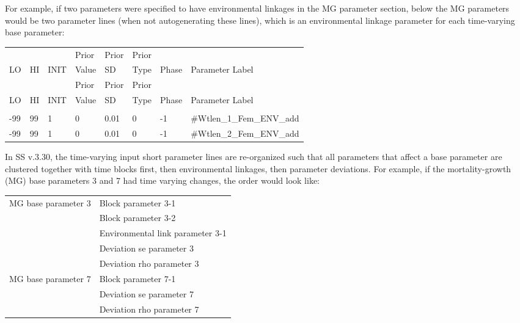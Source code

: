 For example, if two parameters were specified to have environmental linkages in the MG parameter section, below the MG parameters would be two parameter lines (when not autogenerating these lines), which is an environmental linkage parameter for each time-varying base parameter:
\begin{longtable}{ p{0.7cm} p{0.7cm} p{0.7cm}  p{1cm}  p{1.4cm}  p{1cm} p{1cm} p{6.7cm}  }
	\hline
	   &    &      & Prior &  Prior & Prior & & \Tstrut\\
	LO & HI & INIT & Value &  SD    & Type  & Phase & Parameter Label \Bstrut\\
	\hline
	\endfirsthead
	
	\hline
	   &    &      & Prior &  Prior & Prior &  & \Tstrut\\
	LO & HI & INIT & Value &  SD    & Type  & Phase & Parameter Label \Bstrut\\
	\hline
	\endhead
	
	\endfoot
	
	\endlastfoot
	
	\multicolumn{7}{l}{COND: Only if MG parameters are time-varying} \Tstrut\\
	-99   & 99  & 1 & 0 & 0.01 & 0 & -1 &\#Wtlen\_1\_Fem\_ENV\_add\Tstrut\\
	-99   & 99  & 1 & 0 & 0.01 & 0 & -1 &\#Wtlen\_2\_Fem\_ENV\_add\Bstrut\\
	\hline
\end{longtable}

 In SS v.3.30, the time-varying input short parameter lines are re-organized such that all parameters that affect a base parameter are clustered together with time blocks first, then environmental linkages, then parameter deviations. For example, if the mortality-growth (MG) base parameters 3 and 7 had time varying changes, the order would look like:

\begin{center}
	\begin{longtable}{p{5cm} p{10cm}}
		\hline
		MG base parameter 3 & Block parameter 3-1\Tstrut\\
		& Block parameter 3-2\\
		& Environmental link parameter 3-1\\
		& Deviation se parameter 3 \\
		& Deviation rho parameter 3 \Bstrut\\
		MG base parameter 7 & Block parameter 7-1 \\
		& Deviation se parameter 7 \\
		& Deviation rho parameter 7 \Bstrut\\
		\hline	 	                    
		
	\end{longtable}
\end{center}


